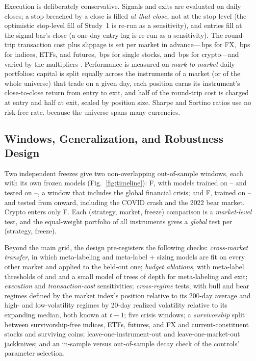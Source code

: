 Execution is deliberately conservative. Signals and exits are evaluated on daily closes; a stop breached by a close is
filled \emph{at that close}, not at the stop level (the optimistic stop-level fill of Study~1 is re-run as a
sensitivity), and entries fill at the signal bar's close (a one-day entry lag is re-run as a sensitivity). The
round-trip transaction cost plus slippage is set per market in advance---\STwoCostfx{}\,bps for FX,
\STwoCostequityindices{}\,bps for indices, ETFs, and futures, \STwoCoststocksus{}\,bps for single stocks, and
\STwoCostcrypto{}\,bps for crypto---and varied by the multipliers \STwoCostMults{}. Performance is measured on
\emph{mark-to-market} daily portfolios: capital is split equally across the instruments of a market (or of the whole
universe) that trade on a given day, each position earns its instrument's close-to-close return from entry to exit,
and half of the round-trip cost is charged at entry and half at exit, scaled by position size. Sharpe and Sortino
ratios use no risk-free rate, because the universe spans many currencies.

\subsection{Windows, Generalization, and Robustness Design}

Two independent freezes give two non-overlapping out-of-sample windows, each with its own frozen models
(Fig.~\ref{fig:timeline}): F\STwoFzA{}, with models trained on \STwoStart--\STwoFzATrainEnd{} and tested on
\STwoFzA--\STwoFzAEnd{}, a window that includes the global financial crisis; and F\STwoFzB{}, trained on
\STwoStart--\STwoFzBTrainEnd{} and tested from \STwoFzB{} onward, including the COVID crash and the 2022 bear market.
Crypto enters only F\STwoFzB{}. Each (strategy, market, freeze) comparison is a \emph{market-level} test, and the
equal-weight portfolio of all \STwoInstruments{} instruments gives a \emph{global} test per (strategy, freeze).

Beyond the main grid, the design pre-registers the following checks: \emph{cross-market transfer}, in which
meta-labeling and meta-label + sizing models are fit on every other market and applied to the held-out one;
\emph{budget ablations}, with meta-label thresholds of \STwoThrLo{} and \STwoThrHi{} and a small model of
\STwoSmallTrees{} trees of depth \STwoSmallDepth{} for meta-labeling and exit; \emph{execution} and
\emph{transaction-cost} sensitivities; \emph{cross-regime} tests, with bull and bear regimes defined by the market
index's position relative to its 200-day average and high- and low-volatility regimes by 20-day realized volatility
relative to its expanding median, both known at $t-1$; five crisis windows; a \emph{survivorship} split between
survivorship-free indices, ETFs, futures, and FX and current-constituent stocks and surviving coins;
leave-one-instrument-out and leave-one-market-out jackknives; and an in-sample versus out-of-sample decay check of the
controls' parameter selection.

